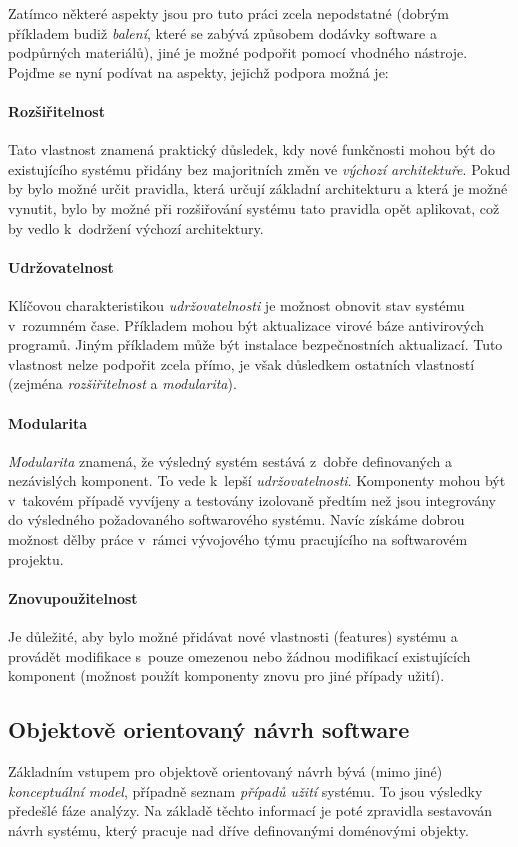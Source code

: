 Zatímco některé aspekty jsou pro tuto práci zcela nepodstatné (dobrým příkladem budiž \emph{balení}, které se zabývá způsobem dodávky software a podpůrných materiálů), jiné je možné podpořit pomocí vhodného nástroje. Pojďme se nyní podívat na aspekty, jejichž podpora možná je:

\paragraph{Rozšiřitelnost} Tato vlastnost znamená praktický důsledek, kdy nové funkčnosti mohou být do existujícího systému přidány bez majoritních změn ve \emph{výchozí architektuře}. Pokud by bylo možné určit pravidla, která určují základní architekturu a která je možné vynutit, bylo by možné při rozšiřování systému tato pravidla opět aplikovat, což by vedlo k~dodržení výchozí architektury.

\paragraph{Udržovatelnost} Klíčovou charakteristikou \emph{udržovatelnosti} je možnost obnovit stav systému v~rozumném čase. Příkladem mohou být aktualizace virové báze antivirových programů. Jiným příkladem může být instalace bezpečnostních aktualizací. Tuto vlastnost nelze podpořit zcela přímo, je však důsledkem ostatních vlastností (zejména \emph{rozšiřitelnost} a \emph{modularita}).

\paragraph{Modularita} \emph{Modularita} znamená, že výsledný systém sestává z~dobře definovaných a nezávislých komponent. To vede k~lepší \emph{udržovatelnosti}. Komponenty mohou být v~takovém případě vyvíjeny a testovány izolovaně předtím než jsou integrovány do výsledného požadovaného softwarového systému. Navíc získáme dobrou možnost dělby práce v~rámci vývojového týmu pracujícího na softwarovém projektu.

\paragraph{Znovupoužitelnost} Je důležité, aby bylo možné přidávat nové vlastnosti (features) systému a provádět modifikace s~pouze omezenou nebo žádnou modifikací existujících komponent (možnost použít komponenty znovu pro jiné případy užití).

\subsection{Objektově orientovaný návrh software}
Základním vstupem pro objektově orientovaný návrh bývá (mimo jiné) \emph{konceptuální model}, případně seznam \emph{případů užití} systému. To jsou výsledky předešlé fáze analýzy. Na základě těchto informací je poté zpravidla sestavován návrh systému, který pracuje nad dříve definovanými doménovými objekty.

